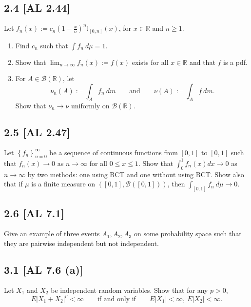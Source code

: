 \documentclass[12pt]{article}
\begin{document}
\subsection*{2.4 [AL 2.44]}
\begin{tcolorbox}
Let $f_{n}(x) := c_{n}\left( 1 - \frac{x}{n} \right)^{n}\mathbb{I}_{[0,n]}(x)$, for $x \in \mathbb{R}$ and $n\geq 1$.
\begin{enumerate}[label=(\alph*)]
\item Find $c_{n}$ such that $\int f_{n}\ d\mu = 1$.
\item Show that $\lim_{n\rightarrow\infty}f_{n}(x) := f(x)$ exists for all $x \in \mathbb{R}$ and that $f$ is a pdf.
\item For $A \in \mathcal{B}(\mathbb{R})$, let 
\[ \nu_{n}(A) := \int_{A}f_{n}\ dm \qquad \text{and} \qquad \nu(A) := \int_{A}f\ dm. \]
Show that $\nu_{n} \rightarrow \nu$ uniformly on $\mathcal{B}(\mathbb{R})$.
\end{enumerate}
\end{tcolorbox}


\subsection*{2.5 [AL 2.47]}
\begin{tcolorbox}
Let $\left\{ f_{n} \right\}_{n=0}^{\infty}$ be a sequence of continuous functions from $[0,1]$ to $[0,1]$ such that $f_{n}(x) \rightarrow 0$ as $n
\rightarrow \infty$ for all $0 \leq x \leq 1$. Show that $\int_{0}^{1}f_{n}(x)dx \rightarrow 0$ as $n\rightarrow \infty$ by two methods: one using BCT
and one without using BCT. Show also that if $\mu$ is a finite measure on $([0,1], \mathcal{B}([0,1]))$, then $\int_{[0,1]}f_{n}\ d\mu \rightarrow 0$.
\end{tcolorbox}



\subsection*{2.6 [AL 7.1]}
\begin{tcolorbox}
Give an example of three events $A_{1}, A_{2}, A_{3}$ on some probability space such that they are pairwise independent but not independent.
\end{tcolorbox}



\subsection*{3.1 [AL 7.6 (a)]}
\begin{tcolorbox}
Let $X_{1}$ and $X_{2}$ be independent random variables. Show that for any $p > 0$,
\[ E|X_{1} + X_{2}|^{p} < \infty \qquad \text{if and only if} \qquad E|X_{1}| < \infty,\  E|X_{2}| < \infty. \]
\end{tcolorbox}
\end{document}
